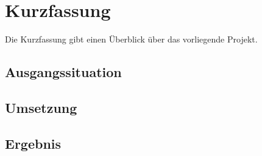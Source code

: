 \chapter{Kurzfassung}

Die Kurzfassung gibt einen Überblick über das vorliegende Projekt.

\section{Ausgangssituation}

\lipsum[20]

\section{Umsetzung}

\lipsum[21-22]

\section{Ergebnis}

\lipsum[22]